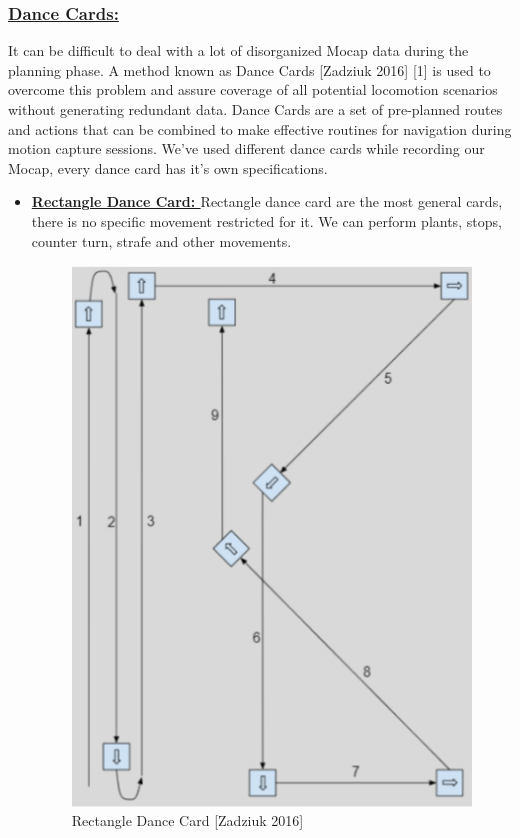 \documentclass[12pt]{book}
\begin{document}
\subsubsection{\underline{\textbf{Dance Cards:}}}
It can be difficult to deal with a lot of disorganized Mocap data during the planning phase. A
method known as Dance Cards [Zadziuk 2016] [1] is used to overcome this problem and assure
coverage of all potential locomotion scenarios without generating redundant data. Dance Cards
are a set of pre-planned routes and actions that can be combined to make effective routines for
navigation during motion capture sessions.
We’ve used different dance cards while recording our Mocap, every dance card has it’s own
specifications.
\begin{itemize}
    \item \textbf{\underline{Rectangle Dance Card: }} Rectangle dance card are the most general cards, there is no specific movement restricted for
          it. We can perform plants, stops, counter turn, strafe and other movements.
          \begin{figure}[!h]
              \centering
              \includegraphics[scale=0.5]{./Figures/Images/RectanglarDC.png}
              \caption{Rectangle Dance Card [Zadziuk 2016]}

\end{figure}
\end{itemize}
\end{document}
